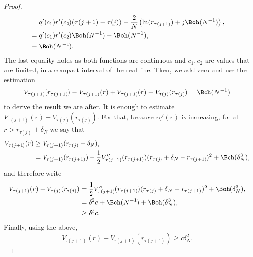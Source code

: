 \begin{proof}
\begin{align}
		& = q'(c_1) r'(c_2) (\tau(j+1) - \tau(j)) - \frac{2}{N} \left(\ln(r_{\tau(j+1)})+j \Boh(N^{-1}) \right), \\
		& = q'(c_1) r'(c_2) \Boh(N^{-1}) - \Boh(N^{-1}), \\
		& = \Boh(N^{-1}).
	\end{align}
	The last equality holds as both functions are continuous and $c_1, c_2$ are values that are limited; in a compact interval of the real line. Then, we add zero and use the estimation
	\begin{equation}
		V_{\tau(j+1)}(r_{\tau(j+1)})  - V_{\tau(j+1)}(r) + V_{\tau(j+1)}(r) - V_{\tau(j)}(r_{\tau(j)}) = \Boh(N^{-1})
	\end{equation}
	to derive the result we are after. It is enough to estimate $V_{\tau(j+1)}(r) - V_{\tau(j)}(r_{\tau(j)})$. For that, because $r q'(r)$ is increasing, for all $r > r_{\tau(j)} + \delta_N$ we say that
	\begin{align}
		V_{\tau(j+1)}(r) & \geq V_{\tau(j+1)}(r_{\tau(j)} + \delta_N), \\
		& =  V_{\tau(j+1)}(r_{\tau(j+1)}) + \frac{1}{2} V''_{\tau(j+1)}(r_{\tau(j+1)}) (r_{\tau(j)} + \delta_N - r_{\tau(j+1)})^2 + \Boh(\delta_N^3),
	\end{align} 
	and therefore write
	\begin{align}
		V_{\tau(j+1)}(r) - V_{\tau(j)}(r_{\tau(j)}) & =  \frac{1}{2} V''_{\tau(j+1)}(r_{\tau(j+1)}) (r_{\tau(j)} + \delta_N - r_{\tau(j+1)})^2 + \Boh(\delta_N^3), \\
		& = \delta^2 c + \Boh(N^{-1}) + \Boh(\delta_N^3), \\
		& \geq  \delta^2 c.
	\end{align}
	Finally, using the above,
	\begin{equation}
		V_{\tau(j+1)}(r) - V_{\tau(j+1)}(r_{\tau(j+1)}) \geq c \delta_N^2.
	\end{equation}


\end{proof}
